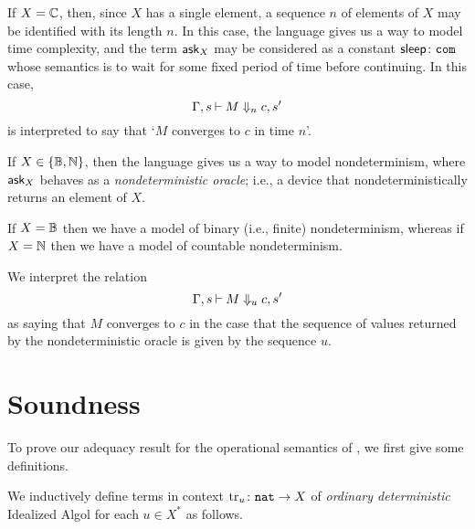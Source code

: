 \documentclass[11pt]{report}
\begin{document}
\begin{example}
  If $X=\mathbb{C}$, then, since $X$ has a single element, a sequence $n$ of elements of $X$ may be identified with its length $n$.
  In this case, the language \IAX gives us a way to model time complexity, and the term $\operatorname{{\mathsf{ask}}}_X$ may be considered as a constant ${\mathsf{sleep}}\colon {\mathtt{com}}$ whose semantics is to wait for some fixed period of time before continuing.  
  In this case, 
  \[
    \Gamma,s\mathbin{\vdash} M \Downarrow_n c,s'
    \]
  is interpreted to say that `$M$ converges to $c$ in time $n$'.
\end{example}
\begin{example}
  If $X\in\{\mathbb{B},\mathbb{N}\}$, then the language \IAX gives us a way to model nondeterminism, where $\operatorname{{\mathsf{ask}}}_X$ behaves as a \emph{nondeterministic oracle}; i.e., a device that nondeterministically returns an element of $X$.

  If $X=\mathbb{B}$ then we have a model of binary (i.e., finite) nondeterminism, whereas if $X=\mathbb{N}$ then we have a model of countable nondeterminism.

  We interpret the relation
  \[
    \Gamma,s\mathbin{\vdash} M \Downarrow_u c,s'
    \]
  as saying that $M$ converges to $c$ in the case that the sequence of values returned by the nondeterministic oracle is given by the sequence $u$.
\end{example}

\section{Soundness}
\label{SecSoundness}

To prove our adequacy result for the operational semantics of \IAX, we first give some definitions.

\begin{definition}
  We inductively define terms in context $\operatorname{tr}_u\colon {\mathtt{nat}} \to X$ of \emph{ordinary deterministic} Idealized Algol for each $u\in X^*$ as follows.
\end{definition}
\end{document}

